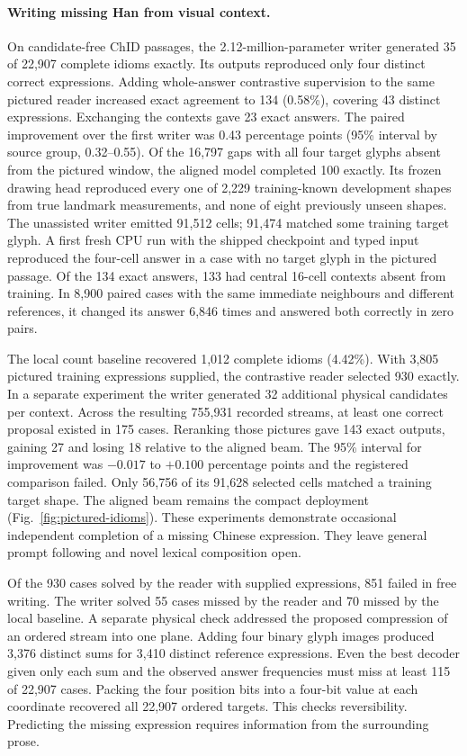 \documentclass[12pt,a4paper]{article}
\providecommand{\DIFadd}[1]{{\protect\color{blue} \sf #1}} %
\begin{document}
\paragraph{\DIFadd{Writing missing Han from visual context.}}
\DIFadd{On candidate-free ChID passages, the 2.12-million-parameter writer
generated 35 of 22,907 complete idioms exactly. Its outputs reproduced
only four distinct correct expressions. Adding whole-answer contrastive
supervision to the same pictured reader increased exact agreement to 134
(0.58\%), covering 43 distinct expressions. Exchanging the contexts gave
23 exact answers. The paired improvement over the first writer was 0.43
percentage points (95\% interval by source group, 0.32--0.55).
Of the 16,797 gaps with all four target glyphs absent from the pictured
window, the aligned model completed 100 exactly. Its frozen drawing head
reproduced every one of 2,229 training-known development shapes from
true landmark measurements, and none of eight previously unseen shapes.
The unassisted writer emitted 91,512 cells; 91,474 matched some training
target glyph. A first fresh CPU run with the shipped checkpoint and
typed input reproduced the four-cell answer in a case with no target glyph
in the pictured passage. Of the 134 exact answers, 133 had central 16-cell contexts
absent from training. In 8,900 paired cases with the same immediate
neighbours and different references, it changed its answer 6,846 times
and answered both correctly in zero pairs.
}

\DIFadd{The local count baseline recovered 1,012 complete idioms (4.42\%).
With 3,805 pictured training expressions supplied, the contrastive reader
selected 930 exactly. In a separate experiment the writer generated
32 additional physical candidates per context. Across the resulting
755,931 recorded streams, at least one correct proposal existed in 175
cases. Reranking those pictures gave 143 exact outputs, gaining 27 and
losing 18 relative to the aligned beam. The 95\% interval for improvement
was $-0.017$ to $+0.100$ percentage points and the registered comparison
failed. Only 56,756 of its 91,628 selected cells matched a training target
shape. The aligned beam remains the compact deployment
(Fig.~\ref{fig:pictured-idioms}). These experiments demonstrate occasional
independent completion of a missing Chinese expression. They leave
general prompt following and novel lexical composition open.
}

\DIFadd{Of the 930 cases solved by the reader with supplied expressions, 851
failed in free writing. The writer solved 55 cases missed by the reader
and 70 missed by the local baseline. A separate physical check addressed
the proposed compression of an ordered stream into one plane. Adding
four binary glyph images produced 3,376 distinct sums for 3,410 distinct
reference expressions. Even the best decoder given only each sum and the
observed answer frequencies must miss at least 115 of 22,907 cases.
Packing the four position bits into a four-bit value at each coordinate
recovered all 22,907 ordered targets. This checks reversibility. Predicting
the missing expression requires information from the surrounding prose.
}
\end{document}
